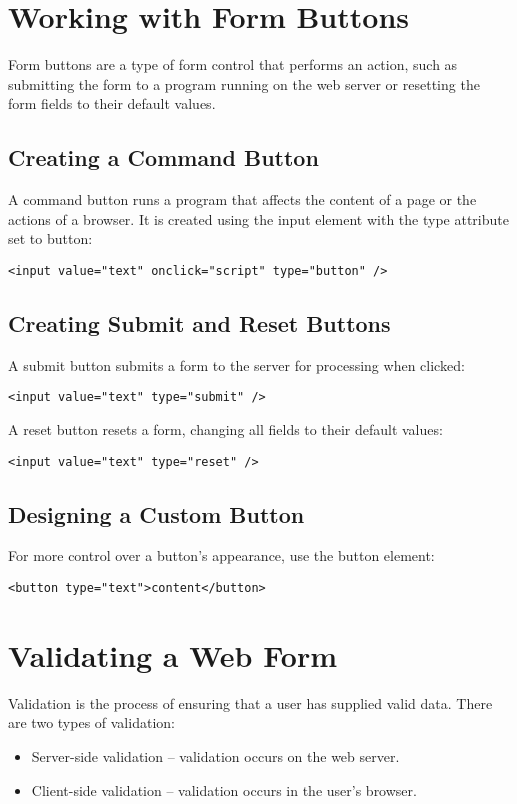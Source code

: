 \documentclass{article}
\begin{document}
\section{Working with Form Buttons}
Form buttons are a type of form control that performs an action, such as submitting the form to a program running on the web server or resetting the form fields to their default values.

\subsection{Creating a Command Button}
A command button runs a program that affects the content of a page or the actions of a browser. It is created using the input element with the type attribute set to button:
\begin{lstlisting}
<input value="text" onclick="script" type="button" />
\end{lstlisting}

\subsection{Creating Submit and Reset Buttons}
A submit button submits a form to the server for processing when clicked:
\begin{lstlisting}
<input value="text" type="submit" />
\end{lstlisting}
A reset button resets a form, changing all fields to their default values:
\begin{lstlisting}
<input value="text" type="reset" />
\end{lstlisting}

\subsection{Designing a Custom Button}
For more control over a button’s appearance, use the button element:
\begin{lstlisting}
<button type="text">content</button>
\end{lstlisting}

\section{Validating a Web Form}
Validation is the process of ensuring that a user has supplied valid data. There are two types of validation:
\begin{itemize}
    \item Server-side validation – validation occurs on the web server.
    \item Client-side validation – validation occurs in the user’s browser.
\end{itemize}
\end{document}
